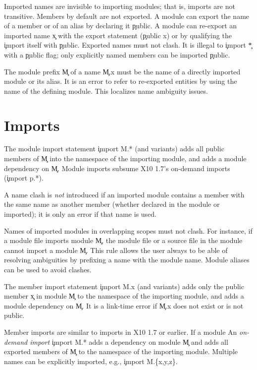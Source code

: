 \documentclass{article}
\newcommand\Xten{{\sf X10}\xspace}
\begin{document}
Imported names are invisible to importing modules; that is,
imports are not transitive.
Members by default are not exported.
A module can export the name of a member or of an alias by declaring 
it \c{public}.
A module can re-export an imported name \c{x} with the export
statement 
(\c{public x}) or by qualifying the \c{import} itself with \c{public}.
Exported names must not clash.  It is illegal to \c{import}
\c{*} with a \c{public} flag; only explicitly named members can be
imported \c{public}.

The module prefix \c{M} of a name \c{M.x} must be the name of a
directly imported module or its alias.
It is an error to refer to re-exported 
entities by using the name of the defining module.  This
localizes name ambiguity issues.

\section{Imports}

The module import statement \c{import M.*} (and variants)
adds all public members of \c{M} into the namespace
of the importing module, and adds a module dependency on \c{M}.
Module imports subsume
\Xten 1.7's
on-demand imports (\c{import p.*}).

A name clash is \emph{not} introduced if an imported module
contains a member with the same name as another member
(whether declared in the module or imported); it is only an
error if that name is used.

Names of imported modules in overlapping scopes must not clash.
For instance, if a module file imports module \c{M},
the module file or a source file in the module cannot import a
module \c{M}.
This rule allows the user always to be able of resolving ambiguities
by prefixing a name with the module name.
Module aliases can be used to avoid clashes.

The member import statement \c{import M.x} (and variants)
adds only the public member \c{x} in module \c{M} to the namespace
of the importing module, and adds a module dependency on \c{M}.
It is a link-time error if \c{M.x} does not exist or is not public.

Member imports are similar to imports in \Xten 1.7 or earlier.
If a module 
An \emph{on-demand import} \c{import M.*} adds a dependency on module \c{M}
and adds all exported members of \c{M} to the namespace of the
importing module.
Multiple names can be explicitly imported, e.g., \c{import M.\{x,y,z\}}.
\end{document}
